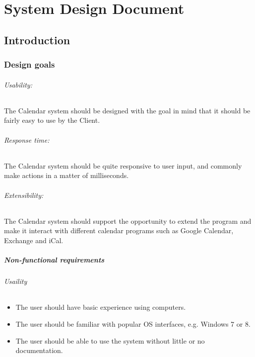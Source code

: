 



\part*{System Design Document}


\chapter*{Introduction}

\section*{Design goals}

\paragraph{Usability: } The Calendar system should be designed with the goal in mind that it should be fairly easy to use by the Client. 

\paragraph{Response time: } The Calendar system should be quite responsive to user input, and commonly make actions in a matter of milliseconds. 

\paragraph{Extensibility: } The Calendar system should support the opportunity to extend the program and make it interact with different calendar programs such as Google Calendar, Exchange and iCal. 

\subsubsection{Non-functional requirements}
\paragraph{Usaility}
\begin{itemize}
	\item The user should have basic experience using computers.
	\item The user should be familiar with popular OS interfaces, e.g. Windows 7 or 8.
	\item The user should be able to use the system without little or no documentation.
\end{itemize}

